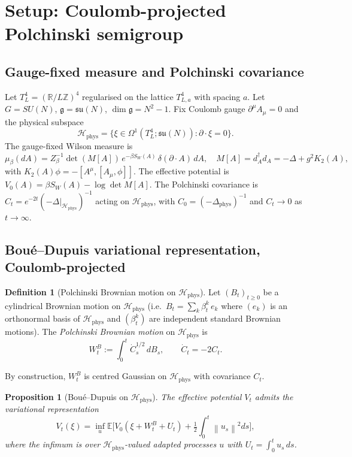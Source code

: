 \documentclass[11pt,a4paper]{amsart}
\newtheorem{proposition}[theorem]{Proposition}
\theoremstyle{definition}
\newtheorem{definition}[theorem]{Definition}
\newcommand{\R}{\mathbb{R}}
\newcommand{\Z}{\mathbb{Z}}
\newcommand{\su}{\mathfrak{su}}
\newcommand{\norm}[1]{\left\lVert#1\right\rVert}
\begin{document}
\section{Setup: Coulomb-projected Polchinski semigroup}\label{sec:setup}

\subsection{Gauge-fixed measure and Polchinski covariance}

Let $T^4_L = (\R/L\Z)^4$ regularised on the lattice $T^4_{L,a}$ with
spacing $a$. Let $G = SU(N)$, $\mathfrak g = \su(N)$, $\dim \mathfrak g = N^2-1$.
Fix Coulomb gauge $\partial^\mu A_\mu = 0$ and the physical subspace
\[
\mathcal H_{\mathrm{phys}} = \bigl\{ \xi \in \Omega^1(T^4_L; \su(N)) : \partial \cdot \xi = 0 \bigr\}.
\]
The gauge-fixed Wilson measure is
\[
\mu_\beta(dA) = Z_\beta^{-1} \det(M[A])\, e^{-\beta S_W(A)}\, \delta(\partial \cdot A)\, dA,
\quad M[A] = d_A^\dagger d_A = -\Delta + g^2 K_2(A),
\]
with $K_2(A)\phi = -[A^\mu,[A_\mu,\phi]]$. The effective potential is
$V_0(A) = \beta S_W(A) - \log\det M[A]$. The Polchinski covariance is
$C_t = e^{-2t}(-\Delta|_{\mathcal H_{\mathrm{phys}}})^{-1}$ acting on
$\mathcal H_{\mathrm{phys}}$, with $C_0 = (-\Delta_{\mathrm{phys}})^{-1}$
and $C_t \to 0$ as $t \to \infty$.

\subsection{Boué--Dupuis variational representation, Coulomb-projected}

\begin{definition}[Polchinski Brownian motion on $\mathcal H_{\mathrm{phys}}$]\label{def:BM}
Let $(B_t)_{t\geq 0}$ be a cylindrical Brownian motion on
$\mathcal H_{\mathrm{phys}}$ (i.e.\ $B_t = \sum_k \beta_t^k\, e_k$ where
$(e_k)$ is an orthonormal basis of $\mathcal H_{\mathrm{phys}}$ and
$(\beta_t^k)$ are independent standard Brownian motions). The
\emph{Polchinski Brownian motion} on $\mathcal H_{\mathrm{phys}}$ is
\[
W_t^B := \int_0^t \dot C_s^{1/2}\, dB_s, \qquad \dot C_t = -2 C_t.
\]
\end{definition}

By construction, $W_t^B$ is centred Gaussian on $\mathcal
H_{\mathrm{phys}}$ with covariance $C_t$.

\begin{proposition}[Boué--Dupuis on $\mathcal H_{\mathrm{phys}}$]\label{prop:BD}
The effective potential $V_t$ admits the variational representation
\begin{equation}\label{eq:BD-rep}
V_t(\xi) = \inf_u \mathbb E\biggl[ V_0(\xi + W_t^B + U_t) + \tfrac12 \int_0^t \norm{u_s}^2 ds \biggr],
\end{equation}
where the infimum is over $\mathcal H_{\mathrm{phys}}$-valued adapted
processes $u$ with $U_t = \int_0^t u_s\, ds$.
\end{proposition}
\end{document}
